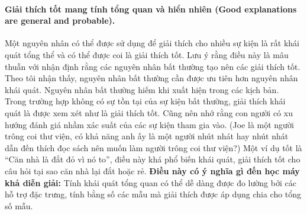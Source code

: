 \paragraph{Giải thích tốt mang tính tổng quan và hiển nhiên (Good explanations are general and probable).} Một nguyên nhân có thể được sử dụng để giải thích cho nhiều sự kiện là rất khái quát tổng thể và có thể được coi là giải thích tốt. Lưu ý rằng điều này là mâu thuẫn với nhận định rằng các nguyên nhân bất thường tạo nên các giải thích tốt. Theo tôi nhận thấy, nguyên nhân bất thường cần được ưu tiên hơn nguyên nhân khái quát. Nguyên nhân bất thường hiếm khi xuất hiện trong các kịch bản. Trong trường hợp không có sự tồn tại của sự kiện bất thường, giải thích khái quát là được xem xét như là giải thích tốt. Cũng nên nhớ rằng con người có xu hướng đánh giá nhầm xác suất của các sự kiện tham gia vào. (Joe là một người trông coi thư viện, có khả năng anh ấy là một người nhút nhát hay nhút nhát dẫn đến thích đọc sách nên muốn làm người trông coi thư viện?) Một ví dụ tốt là ``Căn nhà là đắt đỏ vì nó to'', điều này khá phổ biến khái quát, giải thích tốt cho câu hỏi tại sao căn nhà lại đắt hoặc rẻ.
\textbf{Điều này có ý nghĩa gì đến học máy khả diễn giải:} Tính khái quát tổng quan có thể dễ dàng được đo lường bởi các hỗ trợ đặc trưng, tính bằng số các mẫu mà  giải thích được áp dụng chia cho tổng số mẫu.

\clearpage
